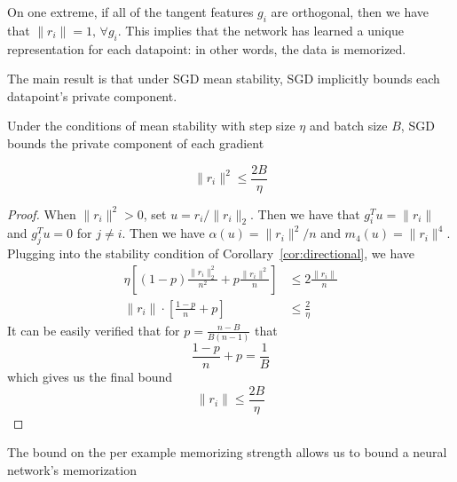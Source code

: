 On one extreme, if all of the tangent features $g_i$ are orthogonal, then we have that $\|r_i\| = 1,\, \forall g_i$. This implies that the network has learned a unique representation for each datapoint: in other words, the data is memorized. 

The main result is that under SGD mean stability, SGD implicitly bounds each datapoint's private component. 

\begin{theorem}
\label{thm:private}
Under the conditions of mean stability with step size $\eta$ and batch size $B$, SGD bounds the private component of each gradient

\begin{equation}
    \|r_i\|^2 \leq \frac{2B}{\eta}
\end{equation}
\end{theorem}
\begin{proof}
    When $\|r_i\|^2 > 0$, set $u = r_i/\|r_i\|_2$. Then we have that $g_i^Tu = \|r_i\|$ and $g_j^Tu = 0$ for $j\neq i$. Then we have $\alpha(u) = \|r_i\|^2/n$ and $m_4(u) = \|r_i\|^4$. Plugging into the stability condition of Corollary~\ref{cor:directional}, we have 
    \begin{align}
    \eta \left[ (1-p) \frac{\|r_i\|_2^2}{n^2} + p\frac{\|r_i\|^2}{n}\right] &\leq 2\frac{\|r_i\|}{n} \\
    \|r_i\|\cdot \left[\frac{1-p}{n} + p\right] &\leq\frac{2}{\eta}
    \end{align}
    It can be easily verified that for $p = \frac{n-B}{B(n-1)}$ that 
    \[\frac{1-p}{n} + p = \frac{1}{B}\]
    which gives us the final bound
    \[\|r_i\| \leq \frac{2B}{\eta}\]
\end{proof}
The bound on the per example memorizing strength allows us to bound a neural network's memorization